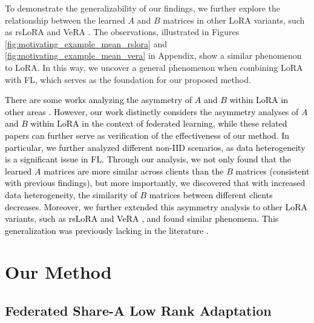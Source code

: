 \documentclass{article} %
\newcommand{\pengxin}[1]{\textcolor{black}{#1}}
\begin{document}
To demonstrate the generalizability of our findings, we further explore  the relationship between the learned $A$ and $B$ matrices in other LoRA variants, such as rsLoRA \citep{kalajdzievski2023rank} and VeRA \citep{kopiczko2024vera}. The observations, illustrated in Figures \ref{fig:motivating_example_mean_rslora} and \ref{fig:motivating_example_mean_vera} in Appendix, show a similar phenomenon to LoRA. In this way, we uncover a general phenomenon when combining LoRA with FL, which serves as the foundation for our proposed method.

\pengxin{There are some works analyzing the asymmetry of $A$ and $B$ within LoRA in other areas \citep{zhu2024asymmetry,tian2024hydralora}. However, our work distinctly considers the asymmetry analyses of $A$ and $B$ within LoRA in the context of federated learning, while these related papers \citep{zhu2024asymmetry,tian2024hydralora} can further serve as verification of the effectiveness of our method. In particular, we further analyzed different non-IID scenarios, as data heterogeneity is a significant issue in FL. Through our analysis, we not only found that the learned $A$ matrices are more similar across clients than the $B$ matrices (consistent with previous findings), but more importantly, we discovered that with increased data heterogeneity, the similarity of $B$ matrices between different clients decreases. %
Moreover, we further extended this asymmetry analysis to other LoRA variants, such as rsLoRA \citep{kalajdzievski2023rank} and VeRA \citep{kopiczko2024vera}, and found similar phenomena. This generalization was previously lacking in the literature \citep{zhu2024asymmetry,tian2024hydralora}.}


\section{Our Method} \label{sec:method}

\subsection{Federated Share-A Low Rank Adaptation}
\end{document}
